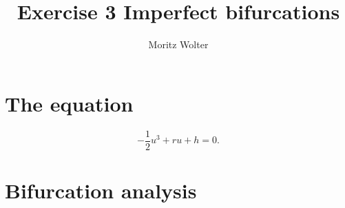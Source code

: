




\title{Exercise 3 Imperfect bifurcations}
\author{Moritz Wolter}

\maketitle

\section{The equation}
\begin{equation}
-\frac{1}{2} u^3 + ru + h = 0. 
\label{eq:toBeAn}
\end{equation}

\section{Bifurcation analysis}
